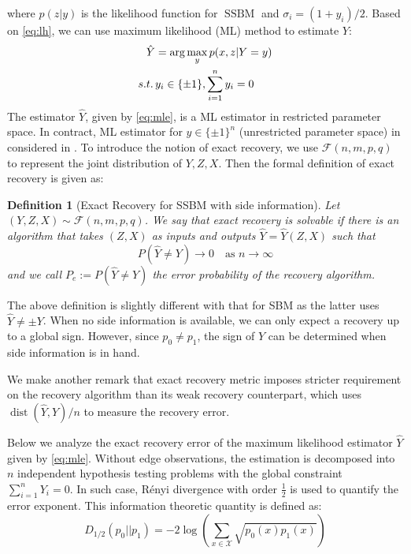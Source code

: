 \documentclass[conference]{IEEEtran}
\newtheorem{definition}{Definition}
\DeclareMathOperator{\SSBM}{SSBM}
\DeclareMathOperator{\dist}{dist}
\begin{document}
where $p(z|y)$ is the likelihood function for $\SSBM$ and $\sigma_i = (1+y_i)/2$.
Based on \eqref{eq:lh}, we can use maximum likelihood (ML) method to estimate
$Y$:
\begin{align}
    \hat{Y} &= \arg\max_y p(x,z|Y=y) \notag \\
    s.t.\, & y_i \in \{\pm 1\}, \sum_{i=1}^n y_i=0 \label{eq:mle}
\end{align}
The estimator $\hat{Y}$, given by \eqref{eq:mle}, is a ML estimator in restricted parameter space.
In contract, ML estimator for $y\in \{ \pm 1 \}^n$ (unrestricted parameter space) in considered in \cite{abbe17sideinfo}.
To introduce the notion of exact recovery, we use $\mathcal{F}(n,m,p,q)$ to represent the joint distribution
of $Y,Z, X$.
Then the formal definition of exact
recovery is given as:
\begin{definition}[Exact Recovery for SSBM with side information]
		Let $(Y,Z,X) \sim \mathcal{F}(n,m,p,q)$.
		We say that exact recovery is solvable if there is an algorithm that takes $(Z,X)$ as inputs and outputs $\hat{Y}=\hat{Y}(Z,X)$ such that
		$$
		P(\hat{Y} \neq Y) \to 0
		\text{~~~as~} n\to\infty
		$$
		and we call $P_e:=P(\hat{Y} \neq Y)$ the error probability of the recovery algorithm.
\end{definition}
The above definition is slightly different with that for SBM as the latter uses $\hat{Y} \neq \pm Y$.
When no side information is available, we can only expect a recovery up to a global sign. However,
since $p_0 \neq p_1$, the sign of $Y$ can be determined when side information is in hand.

We make another remark that exact recovery metric imposes stricter requirement on the recovery algorithm than its weak recovery
counterpart, which uses $\dist(\hat{Y}, Y)/n$ to measure the recovery error.

Below we analyze the exact recovery error of the maximum likelihood estimator $\hat{Y}$
given by \eqref{eq:mle}.
Without edge observations, the estimation is decomposed into $n$
independent hypothesis testing problems with the global constraint $\sum_{i=1}^n Y_i=0$. 
In such case, Rényi divergence with order $\frac{1}{2}$
is used to quantify the error exponent.
This information theoretic quantity is defined as:
\begin{equation}
D_{1/2}(p_0 || p_1) = -2\log(\sum_{x \in \mathcal{X}} \sqrt{p_0(x)p_1(x)} )
\end{equation}
\end{document}
